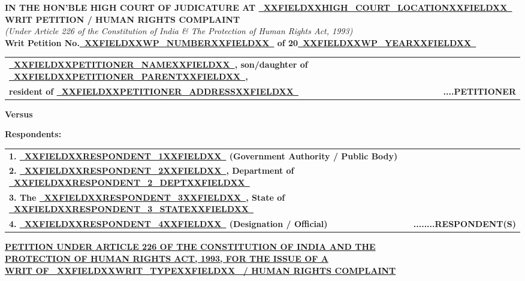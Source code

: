 \documentclass[12pt,a4paper]{article}
\newcommand{\fillline}[1]{\underline{~#1~}}
\begin{document}
\begin{center}
    {\large\textbf{IN THE HON'BLE HIGH COURT OF JUDICATURE AT \fillline{XXFIELDXXHIGH_COURT_LOCATIONXXFIELDXX}}}\\[0.5em]
    {\large\textbf{WRIT PETITION / HUMAN RIGHTS COMPLAINT}}\\[0.3em]
    {\normalsize\textit{(Under Article 226 of the Constitution of India \& The Protection of Human Rights Act, 1993)}}\\[1em]
    \textbf{Writ Petition No.\fillline{XXFIELDXXWP_NUMBERXXFIELDXX} of 20\fillline{XXFIELDXXWP_YEARXXFIELDXX}}
\end{center}

\vspace{1.5em}

\noindent
\begin{tabularx}{\textwidth}{@{}X r@{}}
    \textbf{\fillline{XXFIELDXXPETITIONER_NAMEXXFIELDXX}, son/daughter of \fillline{XXFIELDXXPETITIONER_PARENTXXFIELDXX},} & \\
    \textbf{resident of \fillline{XXFIELDXXPETITIONER_ADDRESSXXFIELDXX}} & \textbf{....PETITIONER}
\end{tabularx}

\vspace{1em}
\begin{center}\textbf{Versus}\end{center}
\vspace{1em}

\noindent\textbf{Respondents:}

\vspace{0.5em}
\noindent
\begin{tabularx}{\textwidth}{@{}X r@{}}
    \textbf{1. \fillline{XXFIELDXXRESPONDENT_1XXFIELDXX} (Government Authority / Public Body)} & \\[0.8em]
    \textbf{2. \fillline{XXFIELDXXRESPONDENT_2XXFIELDXX}, Department of \fillline{XXFIELDXXRESPONDENT_2_DEPTXXFIELDXX}} & \\[0.8em]
    \textbf{3. The \fillline{XXFIELDXXRESPONDENT_3XXFIELDXX}, State of \fillline{XXFIELDXXRESPONDENT_3_STATEXXFIELDXX}} & \\[0.8em]
    \textbf{4. \fillline{XXFIELDXXRESPONDENT_4XXFIELDXX} (Designation / Official)} & \textbf{........RESPONDENT(S)}
\end{tabularx}

\vspace{2em}
\begin{center}
    \uline{\textbf{PETITION UNDER ARTICLE 226 OF THE CONSTITUTION OF INDIA AND THE}}\\
    \uline{\textbf{PROTECTION OF HUMAN RIGHTS ACT, 1993, FOR THE ISSUE OF A}}\\
    \uline{\textbf{WRIT OF \fillline{XXFIELDXXWRIT_TYPEXXFIELDXX} / HUMAN RIGHTS COMPLAINT}}
\end{center}
\end{document}

